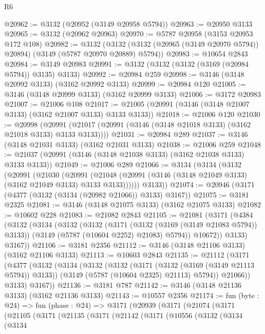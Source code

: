 \begin{lexlean}{R6}
\begin{coremodule}
@20962 := @3132 (@20952 (@3149 @20958 @5794))
@20963 := @20950 @3133
@20965 := @3132 (@20962 @20963)
@20970 := @5787 @20958 (@3153 @20953 @172 @108)
@20982 := @3132
    (@3132 (@3132 (@20965 (@3149 @20970 @5794)) @20894) (@3149 (@5787 @20970 @20889) @5794))
@20983 := @10654 @2843
@20984 := @3149 @20983
@20991 := @3132 (@3132 (@3132 (@3169 (@20984 @5794)) @3135) @3133)
@20992 := @20984 @259
@20998 := @3146 (@3148 @20992 @3133) (@3162 @20992 @3133)
@20999 := @20984 @120
@21005 := @3146 (@3148 @20999 @3133) (@3162 @20999 @3133)
@21006 := @3172 @20983
@21007 := @21006 @108
@21017 := @21005 (@20991 (@3146 (@3148 @21007 @3133) (@3162 @21007 @3133) @3133 @3133))
@21018 := @21006 @120
@21030 := @20998
    (@20991 (@21017 (@20991 (@3146 (@3148 @21018 @3133) (@3162 @21018 @3133) @3133 @3133))))
@21031 := @20984 @289
@21037 := @3146 (@3148 @21031 @3133) (@3162 @21031 @3133)
@21038 := @21006 @259
@21048 := @21037 (@20991 (@3146 (@3148 @21038 @3133) (@3162 @21038 @3133) @3133 @3133))
@21049 := @21006 @289
@21066 := @3134
    (@3134
      (@3132
        (@20991
          (@21030
            (@20991
              (@21048 (@20991 (@3146 (@3148 @21049 @3133) (@3162 @21049 @3133) @3133 @3133))))))
        @3133))
@21074 := @20946 (@3171 (@4377 (@3132 (@3134 (@20982 @21066)) @3133) @3167))
@21075 := @3181 @2325
@21081 := @3146 (@3148 @21075 @3133) (@3162 @21075 @3133)
@21082 := @10602 @228
@21083 := @21082 @2843
@21105 := @21081
    (@3171
      (@4384
        (@3132
          (@3134
            (@3132
              (@3132
                (@3171 (@3132 (@3169 (@3149 @21083 @5794)) @3133))
                (@3149 (@5787 (@10604 @2252) @21083) @5794))
              @10672))
          @3133)
        @3167))
@21106 := @3181 @2356
@21112 := @3146 (@3148 @21106 @3133) (@3162 @21106 @3133)
@21113 := @10603 @2843
@21135 := @21112
    (@3171
      (@4377
        (@3132
          (@3134
            (@3132
              (@3132
                (@3171 (@3132 (@3169 (@3149 @21113 @5794)) @3133))
                (@3149 (@5787 (@10604 @2325) @21113) @5794))
              @21066))
          @3133)
        @3167))
@21136 := @3181 @787
@21142 := @3146 (@3148 @21136 @3133) (@3162 @21136 @3133)
@21143 := @10557 @2356
@21174 := fun (byte : @24) =>
  fun (phase : @24) =>
  @3171
    (@20939
      (@3171
        (@21074
          (@3171
            (@21105
              (@3171
                (@21135
                  (@3171
                    (@21142
                      (@3171
                        (@10556
                          (@3132
                            (@3134
                              (@3134

\end{coremodule}
\end{lexlean}
